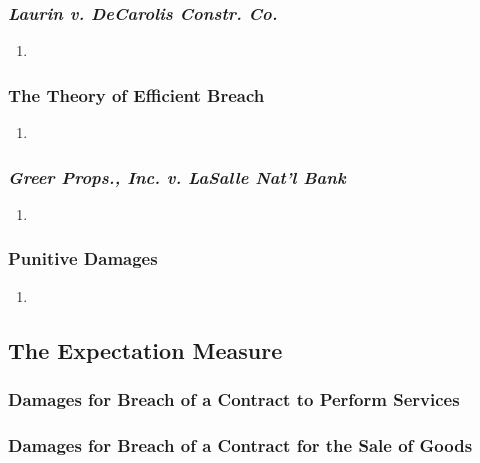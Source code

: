 \subsubsection{\emph{Laurin v. DeCarolis Constr. Co.}}

\begin{enumerate}
    \item %
\end{enumerate}

\subsubsection{The Theory of Efficient Breach}

\begin{enumerate}
    \item %
\end{enumerate}

\subsubsection{\emph{Greer Props., Inc. v. LaSalle Nat'l Bank}}

\begin{enumerate}
    \item %
\end{enumerate}

\subsubsection{Punitive Damages}

\begin{enumerate}
    \item %
\end{enumerate}

\subsection{The Expectation Measure}

\subsubsection{Damages for Breach of a Contract to Perform Services}


\subsubsection{Damages for Breach of a Contract for the Sale of Goods}

